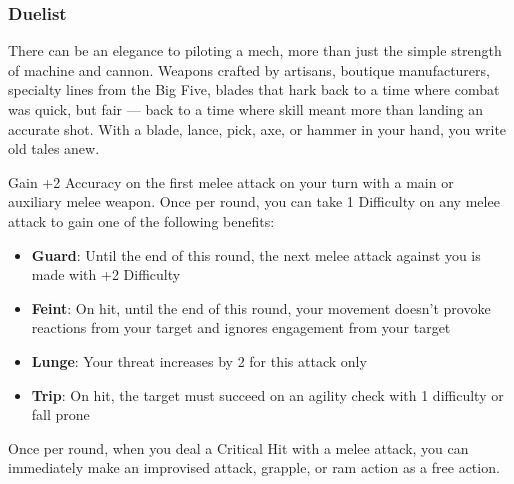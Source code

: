 \subsubsection{Duelist}

\begin{talent}
{There can be an elegance to piloting a mech, more than just the simple strength of machine and cannon. Weapons crafted by artisans, boutique manufacturers, specialty lines from the Big Five, blades that hark back to a time where combat was quick, but fair — back to a time where skill meant more than landing an accurate shot. With a blade, lance, pick, axe, or hammer in your hand, you write old tales anew.}

Gain +2 Accuracy on the first melee attack on your turn with a main or auxiliary melee weapon. 
Once per round, you can take 1 Difficulty on any melee attack to gain one of the following benefits: 
\begin{itemize}
\item \textbf{Guard}: Until the end of this round, the next melee attack against you is made with +2 Difficulty 
\item \textbf{Feint}: On hit, until the end of this round, your movement doesn't provoke reactions from your target and ignores engagement from your target 
\item \textbf{Lunge}: Your threat increases by 2 for this attack only 
\item \textbf{Trip}: On hit, the target must succeed on an agility check with 1 difficulty or fall prone
\end{itemize}
Once per round, when you deal a Critical Hit with a melee attack, you can immediately make an improvised attack, grapple, or ram action as a free action.
\end{talent}
